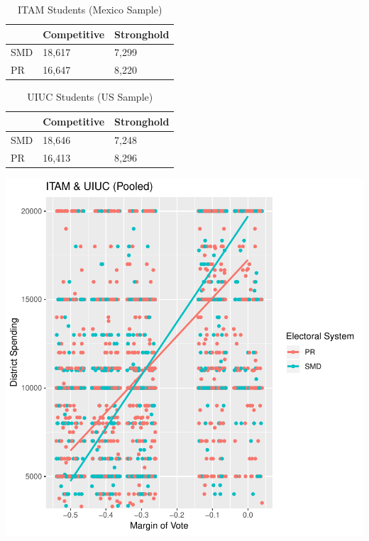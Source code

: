 \documentclass{article}
\begin{document}
\begin{table}[t]

\caption{\label{tab:}ITAM Students (Mexico Sample)}
\centering
\begin{tabular}{l|l|l}
\hline
  & Competitive & Stronghold\\
\hline
SMD & 18,617 & 7,299\\
\hline
PR & 16,647 & 8,220\\
\hline
\end{tabular}
\end{table}
\begin{table}[t]

\caption{\label{tab:}UIUC Students (US Sample)}
\centering
\begin{tabular}{l|l|l}
\hline
  & Competitive & Stronghold\\
\hline
SMD & 18,646 & 7,248\\
\hline
PR & 16,413 & 8,296\\
\hline
\end{tabular}
\end{table}

\includegraphics{MPSA_figures-008}
\end{document}
